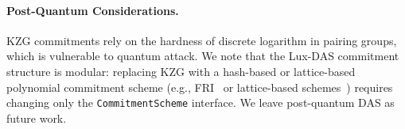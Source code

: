 \paragraph{Post-Quantum Considerations.}
KZG commitments rely on the hardness of discrete logarithm in pairing groups, which is
vulnerable to quantum attack. We note that the Lux-DAS commitment structure is modular:
replacing KZG with a hash-based or lattice-based polynomial commitment scheme (e.g.,
FRI~\cite{ben2018fast} or lattice-based schemes~\cite{peikert2019noninteractive}) requires
changing only the \texttt{CommitmentScheme} interface. We leave post-quantum DAS as future
work.


